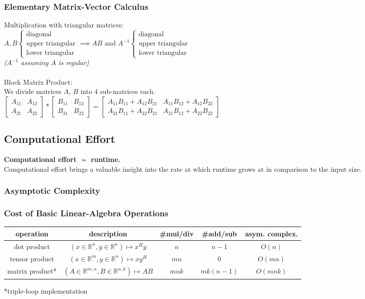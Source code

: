 \documentclass[12pt]{article}
\begin{document}
\subsubsection{Elementary Matrix-Vector Calculus}
Multiplication with triangular matrices:\\
$A,B \begin{cases}\text{diagonal} \\ \text{upper triangular} \\ \text{lower triangular} \end{cases} \implies AB \text{ and } A^{-1} \begin{cases}\text{diagonal} \\ \text{upper triangular} \\ \text{lower triangular} \end{cases}$\\
\textit{($A^{-1}$ assuming $A$ is regular)}\\\\
Block Matrix Product:\\
We divide matrices $A$, $B$ into 4 sub-matrices each.\\
$\begin{bmatrix}A_{11} & A_{12} \\ A_{21} & A_{22} \end{bmatrix} * \begin{bmatrix}B_{11} & B_{12} \\ B_{21} & B_{22}\end{bmatrix} = \begin{bmatrix}A_{11}B_{11} + A_{12}B_{21} & A_{11}B_{12} + A_{12}B_{22} \\ A_{21}B_{11} + A_{22}B_{21} & A_{21}B_{12} + A_{22}B_{22}\end{bmatrix}$
\subsection{Computational Effort}
\textbf{Computational effort $\nsim$ runtime.}\\
Computational effort brings a valuable insight into the rate at which runtime grows at in comparison to the input size.
\subsubsection{Asymptotic Complexity}

\subsubsection{Cost of Basic Linear-Algebra Operations}
\begin{tabularx}{\linewidth}{c | c c c c}
operation & description & \#mul/div & \#add/sub & asym. complex.\\ \hline
dot product & $(x \in \mathbb{R}^n, y \in \mathbb{R}^n) \mapsto x^Hy$ & $n$ & $n-1$ & $O(n)$\\
tensor product & $(x \in \mathbb{R}^m, y \in \mathbb{R}^n) \mapsto xy^H$ & $mn$ & $0$ & $O(mn)$\\
matrix product* & $(A \in \mathbb{R}^{m,n}, B \in \mathbb{R}^{n,k}) \mapsto AB$ & $mnk$ & $mk(n-1)$ & $O(mnk)$
\end{tabularx}
*triple-loop implementation
\end{document}
